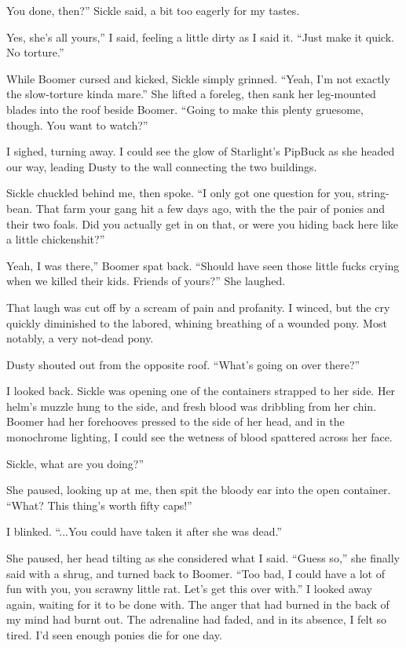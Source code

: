 \leavevmode{}You done, then?” Sickle said, a bit too eagerly for my tastes.

\leavevmode{}Yes, she’s all yours,” I said, feeling a little dirty as I said it. “Just make it quick. No torture.”

While Boomer cursed and kicked, Sickle simply grinned. “Yeah, I’m not exactly the slow-torture kinda mare.” She lifted a foreleg, then sank her leg-mounted blades into the roof beside Boomer. “Going to make this plenty gruesome, though. You want to watch?”

I sighed, turning away. I could see the glow of Starlight’s PipBuck as she headed our way, leading Dusty to the wall connecting the two buildings.

Sickle chuckled behind me, then spoke. “I only got one question for you, string-bean. That farm your gang hit a few days ago, with the the pair of ponies and their two foals. Did you actually get in on that, or were you hiding back here like a little chickenshit?”

\leavevmode{}Yeah, I was there,” Boomer spat back. “Should have seen those little fucks crying when we killed their kids. Friends of yours?” She laughed.

That laugh was cut off by a scream of pain and profanity. I winced, but the cry quickly diminished to the labored, whining breathing of a wounded pony. Most notably, a very not-dead pony.

Dusty shouted out from the opposite roof. “What’s going on over there?”

I looked back. Sickle was opening one of the containers strapped to her side. Her helm’s muzzle hung to the side, and fresh blood was dribbling from her chin. Boomer had her forehooves pressed to the side of her head, and in the monochrome lighting, I could see the wetness of blood spattered across her face.

\leavevmode{}Sickle, what are you doing?”

She paused, looking up at me, then spit the bloody ear into the open container. “What? This thing’s worth fifty caps!”

I blinked. “...You could have taken it after she was dead.”

She paused, her head tilting as she considered what I said. “Guess so,” she finally said with a shrug, and turned back to Boomer. “Too bad, I could have a lot of fun with you, you scrawny little rat. Let’s get this over with.” I looked away again, waiting for it to be done with. The anger that had burned in the back of my mind had burnt out. The adrenaline had faded, and in its absence, I felt so tired. I’d seen enough ponies die for one day.

